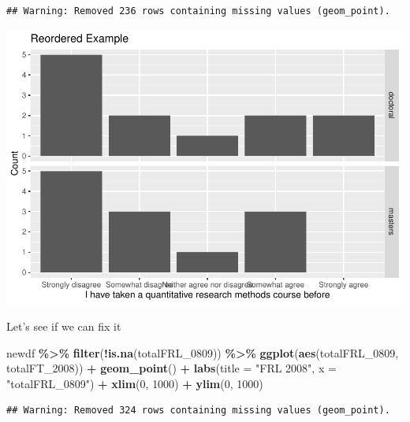 \documentclass[
]{book}
\newenvironment{Shaded}{\begin{snugshade}}{\end{snugshade}}
\newcommand{\DataTypeTok}[1]{\textcolor[rgb]{0.13,0.29,0.53}{#1}}
\newcommand{\DecValTok}[1]{\textcolor[rgb]{0.00,0.00,0.81}{#1}}
\newcommand{\KeywordTok}[1]{\textcolor[rgb]{0.13,0.29,0.53}{\textbf{#1}}}
\newcommand{\NormalTok}[1]{#1}
\newcommand{\OperatorTok}[1]{\textcolor[rgb]{0.81,0.36,0.00}{\textbf{#1}}}
\newcommand{\StringTok}[1]{\textcolor[rgb]{0.31,0.60,0.02}{#1}}
\begin{document}
\begin{verbatim}
## Warning: Removed 236 rows containing missing values (geom_point).
\end{verbatim}

\includegraphics{test_course_notes_files/figure-latex/unnamed-chunk-35-1.pdf}

Let's see if we can fix it

\begin{Shaded}
\begin{Highlighting}[]
\NormalTok{newdf }\OperatorTok{\%\textgreater{}\%}\StringTok{ }
\StringTok{  }\KeywordTok{filter}\NormalTok{(}\OperatorTok{!}\KeywordTok{is.na}\NormalTok{(totalFRL\_}\DecValTok{0809}\NormalTok{)) }\OperatorTok{\%\textgreater{}\%}
\StringTok{  }\KeywordTok{ggplot}\NormalTok{(}\KeywordTok{aes}\NormalTok{(totalFRL\_}\DecValTok{0809}\NormalTok{, totalFT\_}\DecValTok{2008}\NormalTok{)) }\OperatorTok{+}
\StringTok{  }\KeywordTok{geom\_point}\NormalTok{() }\OperatorTok{+}
\StringTok{  }\KeywordTok{labs}\NormalTok{(}\DataTypeTok{title =} \StringTok{"FRL 2008"}\NormalTok{, }
       \DataTypeTok{x =} \StringTok{"totalFRL\_0809"}\NormalTok{) }\OperatorTok{+}
\StringTok{  }\KeywordTok{xlim}\NormalTok{(}\DecValTok{0}\NormalTok{, }\DecValTok{1000}\NormalTok{) }\OperatorTok{+}
\StringTok{  }\KeywordTok{ylim}\NormalTok{(}\DecValTok{0}\NormalTok{, }\DecValTok{1000}\NormalTok{)}
\end{Highlighting}
\end{Shaded}

\begin{verbatim}
## Warning: Removed 324 rows containing missing values (geom_point).
\end{verbatim}
\end{document}
